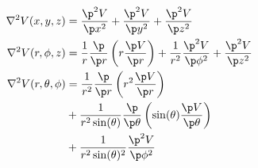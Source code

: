 \begin{align*}
	\nabla^2 V(x,y,z) &= \frac{\p^2 V}{\p x^2} + \frac{\p^2 V}{\p y^2} + \frac{\p^2 V}{\p z^2} \\
%
	\nabla^2 V(r,\phi,z) &=%
		\frac{1}{r} \frac{\p}{\p r} \left( r \frac{\p V}{\p r} \right) +%
		\frac{1}{r^2} \frac{\p^2 V}{\p \phi^2} +%
		\frac{\p^2 V}{\p z^2} \\
%
	\nabla^2 V(r,\theta,\phi) &=%
		\frac{1}{r^2} \frac{\p}{\p r} \left( r^2 \frac{\p V}{\p r} \right)\\%
							  &+\frac{1}{r^2 \sin(\theta)} \frac{\p}{\p \theta} \left( \sin(\theta)\frac{\p V}{\p \theta} \right)\\%
							  &+\frac{1}{r^2 \sin(\theta)^2} \frac{\p^2 V}{\p \phi^2}
\end{align*}
